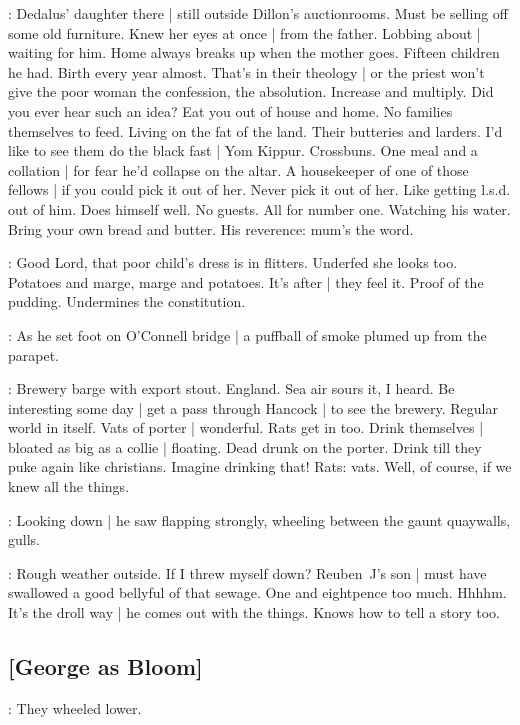 \BloomInt:
Dedalus' daughter there |
still outside Dillon's auctionrooms.
Must be selling off some old furniture.
Knew her eyes at once |
from the father.
Lobbing about |
waiting for him.
Home always breaks up when the mother goes.
Fifteen children he had.
Birth every year almost.
That's in their theology |
or the priest won't give the poor woman
the confession,
the absolution.
Increase and multiply.
Did you ever hear such an idea?
Eat you out of house and home.
No families themselves to feed.
Living on the fat of the land.
Their butteries and larders.
I'd like to see them do the black fast |
Yom Kippur.
Crossbuns.
One meal and a collation |
for fear he'd collapse on the altar.
A housekeeper of one of those fellows |
if you could pick it out of her.
Never pick it out of her.
Like getting l.s.d.\@ {} out of him.
Does himself well.
No guests.
All for number one.
Watching his water.
Bring your own bread and butter.
His reverence:
mum's the word.

\BloomInt:
Good Lord, that poor child's dress is in flitters.
Underfed she looks too.
Potatoes and marge,
marge and potatoes.
It's after |
they feel it.
Proof of the pudding.
Undermines the constitution.

:
As he set foot on O'Connell bridge |
a puffball of smoke plumed up from the parapet.

\BloomInt:
Brewery barge with export stout.
England.
Sea air sours it, I heard.
Be interesting some day |
get a pass through Hancock |
to see the brewery.
Regular world in itself.
Vats of porter |
wonderful.
Rats get in too.
Drink themselves |
bloated as big as a collie |
floating.
Dead drunk on the porter.
Drink till they puke again like christians.
Imagine drinking that!
Rats: vats.
Well, of course,
if we knew all the things.

:
Looking down |
he saw flapping strongly,
wheeling between the gaunt quaywalls,
gulls.

\BloomInt:
Rough weather outside.
If I threw myself down?
Reuben~J's son |
must have swallowed a good bellyful of that sewage.
One and eightpence too much.
Hhhhm.
It's the droll way |
he comes out with the things.
Knows how to tell a story too.

\subsection{[George as Bloom]}

:
They wheeled lower.

